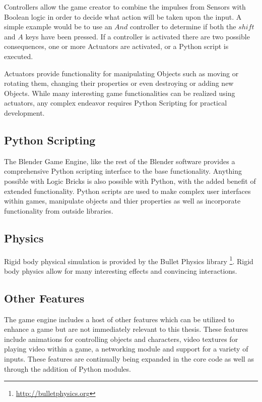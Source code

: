 Controllers allow the game creator to combine the impulses from Sensors with
Boolean logic in order to decide what action will be taken upon the input. A
simple example would be to use an $And$ controller to determine if both the
$shift$ and $A$ keys have been pressed. If a controller is activated there are
two possible consequences, one or more Actuators are activated, or a Python
script is executed.


Actuators provide functionality for manipulating Objects such as moving or
rotating them, changing their properties or even destroying or adding new
Objects. While many interesting game functionalities can be realized using
actuators, any complex endeavor requires Python Scripting for practical
development.

\subsection{Python Scripting}
The Blender Game Engine, like the rest of the Blender software provides a
comprehensive Python scripting interface to the base functionality. Anything
possible with Logic Bricks is also possible with Python, with the added benefit
of extended functionality. Python scripts are used to make complex user
interfaces within games, manipulate objects and thier properties as well as
incorporate functionality from outside libraries.


\subsection{Physics}
Rigid body physical simulation is provided by the Bullet Physics library
\footnote{\url{http://bulletphysics.org}}. Rigid body physics allow for many interesting
effects and convincing interactions.



\subsection{Other Features}

The game engine includes a host of other features which can be utilized to
enhance a game but are not immediately relevant to this thesis. These features
include animations for controlling objects and characters, video textures for
playing video within a game, a networking module and support for a variety of
inputs. These features are continually being expanded in the core code as well as through
the addition of Python modules. 





